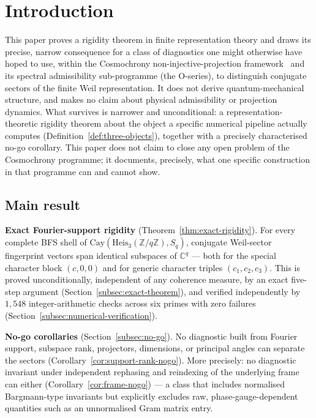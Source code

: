 \documentclass[11pt,a4paper]{article}
\begin{document}
    \clearpage

  \section{Introduction}
  \label{sec:introduction}

  This paper proves a rigidity theorem in finite representation theory and draws its precise,
  narrow consequence for a class of diagnostics one might otherwise have hoped to use, within the
  Cosmochrony non-injective-projection framework~\cite{Cosmochrony} and its spectral admissibility
  sub-programme (the O-series), to distinguish conjugate sectors of the finite Weil representation.
  It does not derive quantum-mechanical structure, and makes no claim about physical admissibility
  or projection dynamics. What survives is narrower and unconditional: a representation-theoretic
  rigidity theorem about the object a specific numerical pipeline actually computes
  (Definition~\ref{def:three-objects}), together with a precisely characterised no-go corollary.
  This paper does not claim to close any open problem of the Cosmochrony programme; it documents,
  precisely, what one specific construction in that programme can and cannot show.

  \subsection*{Main result}

    \textbf{Exact Fourier-support rigidity} (Theorem~\ref{thm:exact-rigidity}). For every complete
    BFS shell of $\mathrm{Cay}(\mathrm{Heis}_3(\mathbb{Z}/q\mathbb{Z}), S_q)$, conjugate Weil-sector
    fingerprint vectors span identical subspaces of $\mathbb{C}^q$ --- both for the special character
    block $(c,0,0)$ and for generic character triples $(c_1,c_2,c_3)$. This is proved unconditionally,
    independent of any coherence measure, by an exact five-step argument
    (Section~\ref{subsec:exact-theorem}), and verified independently by $1{,}548$ integer-arithmetic
    checks across six primes with zero failures (Section~\ref{subsec:numerical-verification}).

    \textbf{No-go corollaries} (Section~\ref{subsec:no-go}). No diagnostic built from Fourier
    support, subspace rank, projectors, dimensions, or principal angles can separate the sectors
    (Corollary~\ref{cor:support-rank-nogo}). More precisely: no diagnostic invariant under
    independent rephasing and reindexing of the underlying frame can either
    (Corollary~\ref{cor:frame-nogo}) --- a class that includes normalised Bargmann-type invariants
    but explicitly excludes raw, phase-gauge-dependent quantities such as an unnormalised Gram
    matrix entry.
\end{document}

